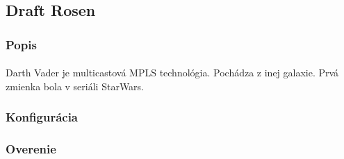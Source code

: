 \documentclass[12pt,twoside,a4paper]{report}
\begin{document}
\subsection{Draft Rosen}
\subsubsection{Popis}
\paragraph{}
Darth Vader je multicastová MPLS technológia. Pochádza z inej galaxie. Prvá zmienka bola v seriáli StarWars.

\subsubsection{Konfigurácia}
\paragraph{}

\subsubsection{Overenie}
\paragraph{}
\end{document}
